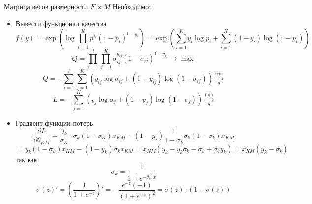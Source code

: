 \documentclass[%
10pt, %
final, %
oneside, %
onecolumn, %
centertags]{article} %
\theoremstyle{plain}
\theoremstyle{definition}
\theoremstyle{remark}
\begin{document}
Матрица весов размерности $K \times M$
Необходимо:
\begin{itemize}
	\item Вывести функционал качества
	$$f(y) = \exp \left(\log \prod\limits_{i=1}^K p_i^{y_i}(1-p_i)^{1-y_i}\right) = \exp\left(\sum\limits_{i=1}^K y_i \log p_i + \sum\limits_{i=1}^K (1-y_i) \log (1-p_i)\right)$$
	$$Q = \prod\limits_{i=1}^l \prod\limits_{j=1}^K \sigma_{ij}^{y_{ij}}(1-\sigma_{ij})^{1-y_{ij}} \to \max$$
	$$Q = -\sum\limits_{i=1}^l \sum\limits_{j=1}^K \left(y_{ij}\log \sigma_{ij}+(1-y_{ij})\log (1-\sigma_{ij})\right)\xrightarrow[\theta]{\min}$$
	$$L = - \sum\limits_{j=1}^K \left(y_{j}\log \sigma_{j}+(1-y_{j})\log (1-\sigma_{j})\right)\xrightarrow[\theta]{\min}$$
	\item Градиент функции потерь
	$$\frac{\partial L}{\partial \theta_{KM}} = \frac{y_k}{\sigma_{K}} \cdot \sigma_k(1-\sigma_K)x_{KM} - (1-y_k)\frac{1}{1-\sigma_k}\sigma_k (1-\sigma_k) x_{KM} $$
	$$ = y_k(1-\sigma_k)x_{KM} - (1-y_k)\sigma_k x_{KM} = x_{KM}(y_k-y_k\sigma_k-\sigma_k+\sigma_k y_k) = x_{KM}(y_k-\sigma_k)$$
	так как
	$$\sigma_k = \frac{1}{1+e^{-\overline{\theta_k}^T \overline{x}}}$$
	$$\sigma(z)' = \left(\frac{1}{1+e^{-z}}\right)' = - \frac{e^{-z}(-1)}{(1+e^{-z})^2} = \sigma(z) \cdot (1-\sigma(z))$$

\end{itemize}
\end{document}

